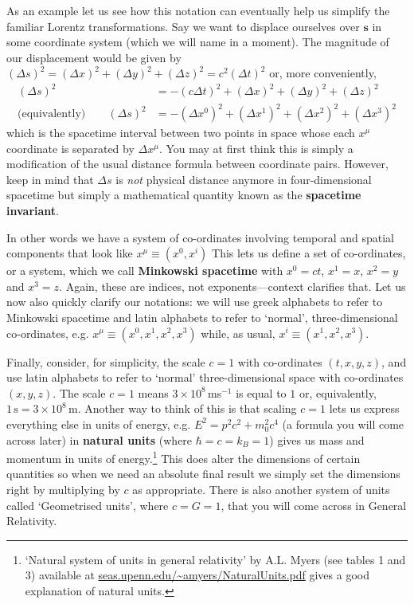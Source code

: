 \documentclass[english,seminar]{lecture}
\begin{document}
As an example let us see how this notation can eventually help us simplify the familiar Lorentz transformations. Say we want to displace ourselves over $\mathbf{s}$ in some coordinate system (which we will name in a moment). The magnitude of our displacement would be given by $(\Delta s)^2 = (\Delta x)^2 + (\Delta y)^2 + (\Delta z)^2 = c^2 (\Delta t)^2$ or, more conveniently,
\begin{align}
	(\Delta s)^2 &= -(c\Delta t)^2 + (\Delta x)^2 + (\Delta y)^2 + (\Delta z)^2 \label{eq:s2} \\
	\textrm{(equivalently)} \qquad (\Delta s)^2 &= -(\Delta x^0)^2 + (\Delta x^1)^2 + (\Delta x^2)^2 + (\Delta x^3)^2 \nonumber
\end{align}%
which is the spacetime interval between two points in space whose each $x^\mu$ coordinate is separated by $\Delta x^\mu$. You may at first think this is simply a modification of the usual distance formula between coordinate pairs. However, keep in mind that $\Delta s$ is \textit{not} physical distance anymore in four-dimensional spacetime but simply a mathematical quantity known as the \textbf{spacetime invariant}.

In other words we have a system of co-ordinates involving temporal and spatial components that look like $x^\mu \equiv (x^0, x^i)$  This lets us define a set of co-ordinates, or a system, which we call \textbf{Minkowski spacetime} with $x^0 = ct$, $x^1 = x$, $x^2 = y$ and $x^3 = z$. Again, these are indices, not exponents---context clarifies that. Let us now also quickly clarify our notations: we will use greek alphabets to refer to Minkowski spacetime and latin alphabets to refer to `normal', three-dimensional co-ordinates, e.g. $x^\mu \equiv (x^0, x^1, x^2, x^3)$ while, as usual, $x^i \equiv (x^1, x^2, x^3)$.

Finally, consider, for simplicity, the scale $c=1$ with co-ordinates $(t,x,y,z)$, and use latin alphabets to refer to `normal' three-dimensional space with co-ordinates $(x,y,z)$. The scale $c=1$ means $3\times 10^8$\,ms$^{-1}$ is equal to $1$ or, equivalently, $1\,\textrm{s} = 3\times 10^8$\,m. Another way to think of this is that scaling $c=1$ lets us express everything else in units of energy, e.g. $E^2 = p^2c^2 + m_0^2c^4$ (a formula you will come across later) in \textbf{natural units} (where $\hbar = c = k_B = 1$) gives us mass and momentum in units of energy.\footnote{`Natural system of units in general relativity' by A.L. Myers (see tables 1 and 3) available at \url{seas.upenn.edu/~amyers/NaturalUnits.pdf} gives a good explanation of natural units.} This does alter the dimensions of certain quantities so when we need an absolute final result we simply set the dimensions right by multiplying by $c$ as appropriate. There is also another system of units called `Geometrised units', where $c=G=1$, that you will come across in General Relativity.
\end{document}
